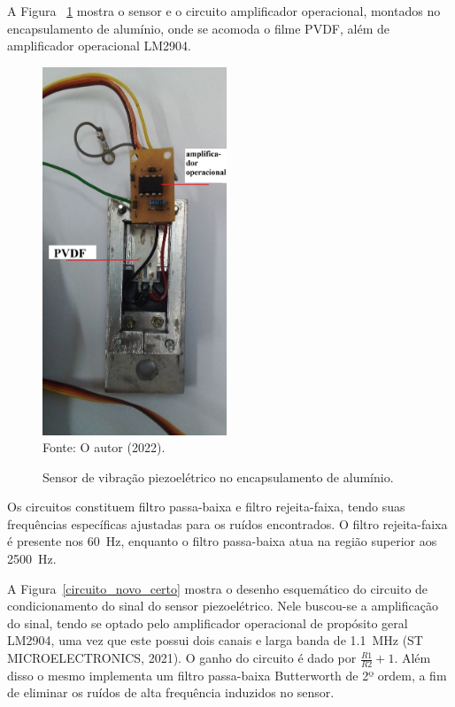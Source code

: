 \documentclass[
	12pt,				
	oneside,			
	a4paper,			
	english,			
	brazil,			
	]{abntex2ppgsi}
\begin{document}
A Figura ~\ref{sensor_e_operacional} mostra o sensor e o circuito amplificador operacional, montados no encapsulamento de alumínio, onde se acomoda o filme PVDF, além de amplificador operacional LM2904.
 
\begin{figure}[H]
\centering
\caption {Sensor de vibração piezoelétrico no encapsulamento de alumínio.}
\includegraphics[width=\textwidth,height=110mm,keepaspectratio]{sensor_e_operacional} \\
Fonte: O autor (2022).
\label{sensor_e_operacional}
\end{figure} 

Os circuitos constituem filtro passa-baixa e filtro rejeita-faixa, tendo suas frequências específicas ajustadas para os ruídos encontrados. O filtro rejeita-faixa é presente nos \SI{60}{\hertz}, enquanto o filtro passa-baixa atua na região superior aos \SI{2500}{\hertz}.

A Figura~\ref{circuito_novo_certo} mostra o desenho esquemático do circuito de condicionamento do sinal do sensor piezoelétrico. Nele buscou-se a amplificação do sinal, tendo se optado pelo amplificador operacional de propósito geral LM2904, uma vez que este possui dois canais e larga banda de \SI{1.1}{\mega\hertz} (ST MICROELECTRONICS, 2021). O ganho do circuito é dado por $ \frac{R1}{R2} + 1$. Além disso o mesmo implementa um filtro passa-baixa Butterworth de 2º ordem, a fim de eliminar os ruídos de alta frequência induzidos no sensor.  
\end{document}
